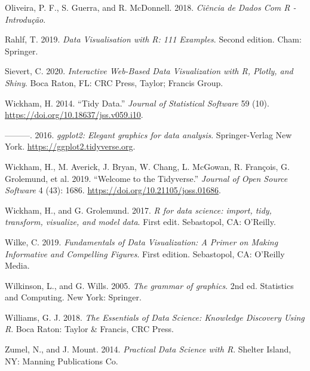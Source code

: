 \documentclass[
]{article}
\newlength{\cslhangindent}
\newlength{\cslentryspacingunit} %
\newenvironment{CSLReferences}[2] %
 {%
  \setlength{\parindent}{0pt}
  \ifodd #1
  \let\oldpar\par
  \def\par{\hangindent=\cslhangindent\oldpar}
  \fi
  \setlength{\parskip}{#2\cslentryspacingunit}
 }%
 {}
\begin{document}
\begin{CSLReferences}{1}{0}
\leavevmode{}%
Oliveira, P. F., S. Guerra, and R. McDonnell. 2018. \emph{Ciência de {Dados} Com {R} - {Introdução}}.

\leavevmode{}%
Rahlf, T. 2019. \emph{Data Visualisation with {R}: 111 Examples}. Second edition. Cham: Springer.

\leavevmode{}%
Sievert, C. 2020. \emph{Interactive Web-Based Data Visualization with {R}, Plotly, and Shiny}. Boca Raton, FL: CRC Press, Taylor; Francis Group.

\leavevmode{}%
Wickham, H. 2014. {``{Tidy Data}.''} \emph{Journal of Statistical Software} 59 (10). \url{https://doi.org/10.18637/jss.v059.i10}.

\leavevmode{}%
---------. 2016. \emph{{ggplot2: Elegant graphics for data analysis}}. Springer-Verlag New York. \url{https://ggplot2.tidyverse.org}.

\leavevmode{}%
Wickham, H., M. Averick, J. Bryan, W. Chang, L. McGowan, R. François, G. Grolemund, et al. 2019. {``{Welcome to the Tidyverse}.''} \emph{Journal of Open Source Software} 4 (43): 1686. \url{https://doi.org/10.21105/joss.01686}.

\leavevmode{}%
Wickham, H., and G. Grolemund. 2017. \emph{{R for data science: import, tidy, transform, visualize, and model data}}. First edit. Sebastopol, CA: O'Reilly.

\leavevmode{}%
Wilke, C. 2019. \emph{Fundamentals of Data Visualization: A Primer on Making Informative and Compelling Figures}. First edition. Sebastopol, CA: O'Reilly Media.

\leavevmode{}%
Wilkinson, L., and G. Wills. 2005. \emph{{The grammar of graphics}}. 2nd ed. Statistics and Computing. New York: Springer.

\leavevmode{}%
Williams, G. J. 2018. \emph{The Essentials of Data Science: Knowledge Discovery Using {R}}. Boca Raton: Taylor \& Francis, CRC Press.

\leavevmode{}%
Zumel, N., and J. Mount. 2014. \emph{Practical Data Science with {R}}. Shelter Island, NY: Manning Publications Co.

\end{CSLReferences}
\end{document}
